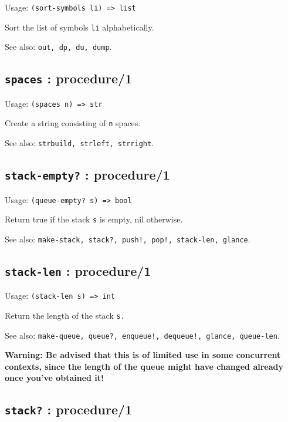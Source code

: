 \documentclass[
]{article}
\newcommand{\passthrough}[1]{#1}
\begin{document}
Usage: \passthrough{\lstinline!(sort-symbols li) => list!}

Sort the list of symbols \passthrough{\lstinline!li!} alphabetically.

See also: \passthrough{\lstinline!out, dp, du, dump!}.

\hypertarget{spaces-procedure1-1}{%
\subsection{\texorpdfstring{\texttt{spaces} :
procedure/1}{spaces : procedure/1}}\label{spaces-procedure1-1}}

Usage: \passthrough{\lstinline!(spaces n) => str!}

Create a string consisting of \passthrough{\lstinline!n!} spaces.

See also: \passthrough{\lstinline!strbuild, strleft, strright!}.

\hypertarget{stack-empty-procedure1-1}{%
\subsection{\texorpdfstring{\texttt{stack-empty?} :
procedure/1}{stack-empty? : procedure/1}}\label{stack-empty-procedure1-1}}

Usage: \passthrough{\lstinline!(queue-empty? s) => bool!}

Return true if the stack \passthrough{\lstinline!s!} is empty, nil
otherwise.

See also:
\passthrough{\lstinline"make-stack, stack?, push!, pop!, stack-len, glance"}.

\hypertarget{stack-len-procedure1-1}{%
\subsection{\texorpdfstring{\texttt{stack-len} :
procedure/1}{stack-len : procedure/1}}\label{stack-len-procedure1-1}}

Usage: \passthrough{\lstinline!(stack-len s) => int!}

Return the length of the stack \passthrough{\lstinline!s.!}

See also:
\passthrough{\lstinline"make-queue, queue?, enqueue!, dequeue!, glance, queue-len"}.

\textbf{Warning: Be advised that this is of limited use in some
concurrent contexts, since the length of the queue might have changed
already once you've obtained it!}

\hypertarget{stack-procedure1-1}{%
\subsection{\texorpdfstring{\texttt{stack?} :
procedure/1}{stack? : procedure/1}}\label{stack-procedure1-1}}
\end{document}
